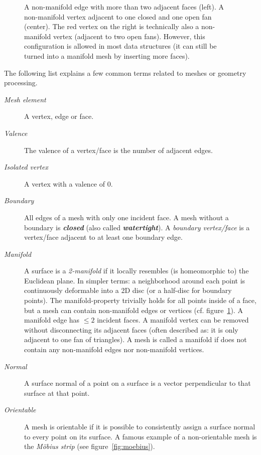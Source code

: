 \begin{figure}[t]
  
  \caption{
    A non-manifold edge with more than two adjacent faces (left).
    A non-manifold vertex adjacent to one closed and one open fan (center).
    The red vertex on the right is technically also a non-manifold vertex (adjacent to two open fans).
    However, this configuration is allowed in most data structures (it can still be turned into a manifold mesh by inserting more faces).}
  \label{fig:non-manifold}
\end{figure}

\newpage
The following list explains a few common terms related to meshes or geometry processing.

\begin{description}
  \item [\emph{Mesh element}] A vertex, edge or face.
  \item [\emph{Valence}] The valence of a vertex/face is the number of adjacent edges.
  \item [\emph{Isolated vertex}] A vertex with a valence of 0.
  \item [\emph{Boundary}] All edges of a mesh with only one incident face.
  A mesh without a boundary is \textbf{\emph{closed}} (also called \textbf{\emph{watertight}}).
  A \emph{boundary vertex/face} is a vertex/face adjacent to at least one boundary edge.
  \item [\emph{Manifold}] A surface is a \emph{2-manifold} if it locally resembles (is homeomorphic to) the Euclidean plane.
  In simpler terms: a neighborhood around each point is continuously deformable into a 2D disc (or a half-disc for boundary points).
  The manifold-property trivially holds for all points inside of a face, but a mesh can contain non-manifold edges or vertices (cf. figure~\ref{fig:non-manifold}).
  A manifold edge has $\le 2$ incident faces.
  A manifold vertex can be removed without disconnecting its adjacent faces (often described as: it is only adjacent to one fan of triangles).
  A mesh is called a manifold if does not contain any non-manifold edges nor non-manifold vertices.
  \item [\emph{Normal}] A surface normal of a point on a surface is a vector perpendicular to that surface at that point.
  \item [\emph{Orientable}] A mesh is orientable if it is possible to consistently assign a surface normal to every point on its surface.
  A famous example of a non-orientable mesh is the \emph{Möbius strip} (see figure~\ref{fig:moebius}).
\end{description}

